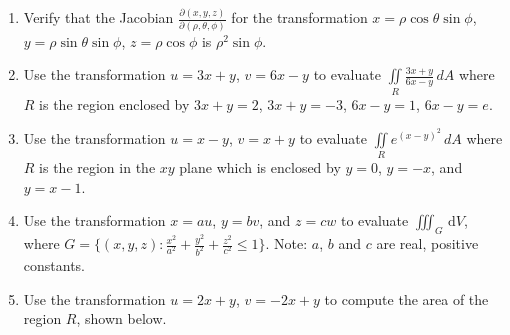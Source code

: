 \documentclass[12pt]{article}
\newif\ifans
\begin{document}
\begin{enumerate}
\ifans{\fbox{$\frac{\partial(x,y)}{\partial(r,\theta)}=\begin{vmatrix}\cos{\theta} & -r\sin{\theta}\\ \sin{\theta} & r\cos{\theta}\end{vmatrix}=r\cos^2{\theta}+r\sin^2{\theta}=r$}} \fi

\item Verify that the Jacobian $\frac{\partial(x,y,z)}{\partial(\rho,\theta,\phi)}$ for the transformation $x=\rho\cos{\theta}\sin{\phi}$, $y=\rho\sin{\theta}\sin{\phi}$, $z=\rho\cos{\phi}$ is $\rho^2\sin{\phi}$.

\ifans{\fbox{$\frac{\partial(x,y,z)}{\partial(\rho,\theta,\phi)}=\begin{vmatrix} \cos{\theta}\sin{\phi} & -\rho\sin{\theta}\cos{\phi} & \rho\cos{\theta}\cos{\phi}\\ \sin{\theta}\sin{\phi} & \rho\cos{\theta}\sin{\phi} & \rho\sin{\theta}\cos{\phi}\\ \cos{\phi} & 0 & -\rho\sin{\phi} \end{vmatrix}=\dots = \rho^2\sin{\phi}$}} \fi

\item Use the transformation $u=3x+y$, $v=6x-y$ to evaluate $\iint \limits_{R} \frac{3x+y}{6x-y} \,dA$ where $R$ is the region enclosed by $3x+y=2$, $3x+y=-3$, $6x-y=1$, $6x-y=e$.

\ifans{\fbox{$-\frac{5}{18}$}} \fi

\item Use the transformation $u=x-y$, $v=x+y$ to evaluate $\iint \limits_{R} e^{(x-y)^2} \,dA$ where $R$ is the region in the $xy$ plane which is enclosed by $y=0$, $y=-x$, and $y=x-1$.

\ifans{\fbox{$\frac{1}{4}(e-1)$; Detailed Solution: \textcolor{blue}{\href{http://www.math.drexel.edu/classes/Calculus/resources/Math200HW/Solutions/21_200_COV_08.pdf}{Here}}}} \fi

\item Use the transformation $x=au$, $y=bv$, and $z=cw$ to evaluate $\displaystyle \iiint_{G}  \,\mathrm{d}V$, where $G = \displaystyle \big\{ (x,y,z) : \frac{x^2}{a^2}+\frac{y^2}{b^2}+\frac{z^2}{c^2}\leq 1 \big\}$.  Note: $a$, $b$ and $c$ are real, positive constants.

\ifans{\fbox{$\frac{4\pi}{3}abc$; This is the volume of the ellipsoid  $\frac{x^2}{a^2}+\frac{y^2}{b^2}+\frac{z^2}{c^2} = 1$}} \fi

\newpage

\item Use the transformation $u=2x+y$, $v=-2x+y$ to compute the area of the region $R$, shown below.


\end{enumerate}
\end{document}
